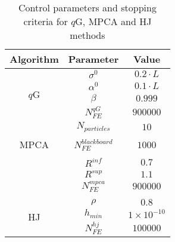 \begin{table}[H]
\caption{Control parameters and stopping criteria for $q$G, MPCA and HJ methods}
\label{tab:param_iss}
\footnotesize
\centering
\begin{tabular}{ccc}
\hline
Algorithm & Parameter & Value \\
\hline
\multirow{4}{*}{$q$G} & $\sigma^0$ & $0.2 \cdot L$\\
 & $\alpha^0$ & $0.1 \cdot L$\\
 & $\beta$ & $0.999$\\
 & $N_{FE}^{qG}$ & $900000$ \\
 \hline
\multirow{5}{*}{MPCA} & $N_{particles}$ & $10$ \\
\\[-0.7em]
& $N_{FE}^{blackboard}$ & $1000$ \\
\\[-0.7em]
 & $R^{inf}$ & $0.7$ \\
 & $R^{sup}$ & $1.1$ \\
 & $N_{FE}^{mpca}$ & $900000$ \\
 \\[-0.7em]
\hline
\multirow{3}{*}{HJ} & $\rho $ & $0.8$ \\
 & $h_{min}$ & $1 \times 10^{-10}$ \\
 & $N_{FE}^{hj}$ & $100000$ \\
\hline
\end{tabular}
\end{table}

